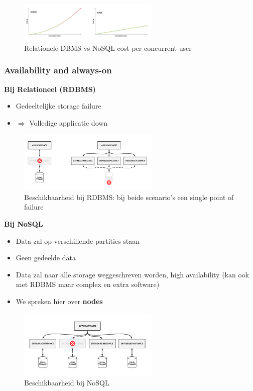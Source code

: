\documentclass{article}
\newcommand{\bold}[1]{\textbf{#1}}
\begin{document}
\begin{figure}[H]
    \centering
    \includegraphics[width=0.6\textwidth]{nosql-cost.png}
    \caption{Relationele DBMS vs NoSQL cost per concurrent user}
\end{figure}


\subsubsection{Availability and always-on}

\bold{Bij Relationeel (RDBMS)}

\begin{itemize}
    \item Gedeeltelijke storage failure
    \item $\Rightarrow$ Volledige applicatie down
\end{itemize}

\begin{figure}[H]
    \centering
    \includegraphics[width=0.6\textwidth]{rdbms-availability.png}
    \caption{Beschikbaarheid bij RDBMS: bij beide scenario's een single point of failure}
\end{figure}

\bold{Bij NoSQL}

\begin{itemize}
    \item Data zal op verschillende partities staan
    \item Geen gedeelde data
    \item Data zal naar alle storage weggeschreven worden, high availability (kan ook met RDBMS maar complex en extra software)
    \item We spreken hier over \bold{nodes}
\end{itemize}

\begin{figure}[H]
    \centering
    \includegraphics[width=0.6\textwidth]{nosql-availability.png}
    \caption{Beschikbaarheid bij NoSQL}
\end{figure}
\end{document}
